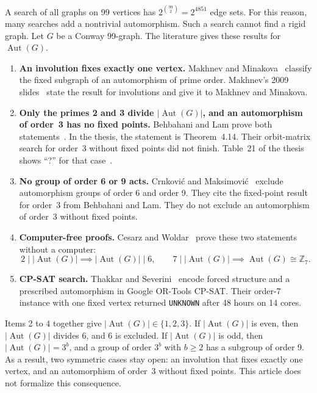 \documentclass[pdflatex,sn-mathphys-num]{sn-jnl}
\theoremstyle{thmstyleone}
\theoremstyle{thmstyletwo}
\theoremstyle{thmstylethree}
\DeclareMathOperator{\Aut}{Aut}
\numberwithin{equation}{section}
\begin{document}
A search of all graphs on 99 vertices has $2^{\binom{99}{2}} = 2^{4851}$ edge sets. For this reason, many searches add a nontrivial automorphism. Such a search cannot find a rigid graph. Let $G$ be a Conway 99-graph. The literature gives these results for $\Aut(G)$.
\begin{enumerate}
 \item \textbf{An involution fixes exactly one vertex.} Makhnev and Minakova~\cite{makhnev2001automorphisms} classify the fixed subgraph of an automorphism of prime order. Makhnev's 2009 slides~\cite{makhnev2009symmetric} state the result for involutions and give it to Makhnev and Minakova.
 \item \textbf{Only the primes 2 and 3 divide $|\Aut(G)|$, and an automorphism of order~3 has no fixed points.} Behbahani and Lam prove both statements~\cite{behbahani2009thesis,behbahani2011strongly}. In the thesis, the statement is Theorem~4.14. Their orbit-matrix search for order~3 without fixed points did not finish. Table~21 of the thesis shows ``?'' for that case~\cite{behbahani2009thesis}.
 \item \textbf{No group of order 6 or 9 acts.} Crnkovi{\'c} and Maksimovi{\'c}~\cite{crnkovic2014strongly} exclude automorphism groups of order 6 and order 9. They cite the fixed-point result for order~3 from Behbahani and Lam. They do not exclude an automorphism of order~3 without fixed points.
 \item \textbf{Computer-free proofs.} Cesarz and Woldar~\cite{cesarz2025automorphisms} prove these two statements without a computer:
 \begin{equation}
  2 \mid |\Aut(G)| \implies |\Aut(G)| \mid 6,
  \qquad
  7 \mid |\Aut(G)| \implies \Aut(G) \cong \mathbb{Z}_7.
  \label{eq:prior_bounds}
 \end{equation}
 \item \textbf{CP-SAT search.} Thakkar and Severini~\cite{thakkar2026forced} encode forced structure and a prescribed automorphism in Google OR-Tools CP-SAT. Their order-7 instance with one fixed vertex returned \texttt{UNKNOWN} after 48 hours on 14 cores.
\end{enumerate}
Items 2 to 4 together give $|\Aut(G)| \in \{1, 2, 3\}$.
If $|\Aut(G)|$ is even, then $|\Aut(G)|$ divides 6, and 6 is excluded.
If $|\Aut(G)|$ is odd, then $|\Aut(G)| = 3^b$, and a group of order $3^b$ with $b \ge 2$ has a subgroup of order 9.
As a result, two symmetric cases stay open: an involution that fixes exactly one vertex, and an automorphism of order~3 without fixed points.
This article does not formalize this consequence.
\end{document}
